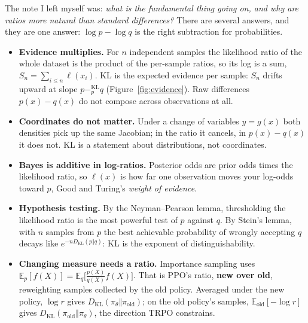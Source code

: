 \documentclass[11pt,oneside]{book}
\newcommand{\kl}[1]{\mathbin{-^{\mathrm{KL}}_{#1}}}       %
\newcommand{\DKL}{D_{\mathrm{KL}}}
\newcommand{\E}{\mathbb{E}}
\theoremstyle{definition}
\theoremstyle{plain}
\theoremstyle{remark}
\begin{document}
The note I left myself was: \emph{what is the fundamental thing going on, and why are ratios more natural than standard
differences?} There are several answers, and they are one answer: $\log p-\log q$ is the right subtraction for
probabilities.

\begin{itemize}
\item \textbf{Evidence multiplies.} For $n$ independent samples the likelihood ratio of the whole dataset is the
product of the per-sample ratios, so its log is a sum, $S_n=\sum_{i\le n}\ell(x_i)$. KL is the expected evidence per
sample: $S_n$ drifts upward at slope $p\kl{p}q$ (Figure~\ref{fig:evidence}). Raw differences $p(x)-q(x)$ do not
compose across observations at all.
\item \textbf{Coordinates do not matter.} Under a change of variables $y=g(x)$ both densities pick up the same Jacobian;
in the ratio it cancels, in $p(x)-q(x)$ it does not. KL is a statement about distributions, not coordinates.
\item \textbf{Bayes is additive in log-ratios.} Posterior odds are prior odds times the likelihood ratio, so $\ell(x)$
is how far one observation moves your log-odds toward $p$, Good and Turing's \emph{weight of evidence}.
\item \textbf{Hypothesis testing.} By the Neyman--Pearson lemma, thresholding the likelihood ratio is the most powerful
test of $p$ against $q$. By Stein's lemma, with $n$ samples from $p$ the best achievable probability of wrongly
accepting $q$ decays like $e^{-n\DKL(p\Vert q)}$: KL is the exponent of distinguishability.
\item \textbf{Changing measure needs a ratio.} Importance sampling uses $\E_p[f(X)]=\E_q\big[\tfrac{p(X)}{q(X)}f(X)\big]$.
That is PPO's ratio, \textbf{new over old}, reweighting samples collected by the old policy. Averaged under the new
policy, $\log r$ gives $\DKL(\pi_\theta\Vert\pi_{\mathrm{old}})$; on the old policy's samples, $\E_{\mathrm{old}}[-\log r]$ gives
$\DKL(\pi_{\mathrm{old}}\Vert\pi_\theta)$, the direction TRPO constrains.
\end{itemize}
\end{document}
